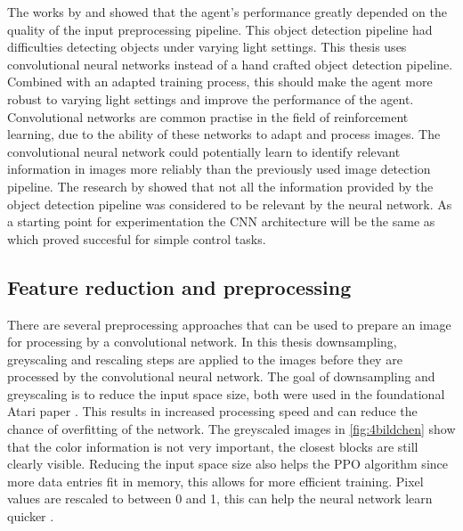 The works by \autocite{merlin_flach} and \autocite{maximilian} showed that the agent's performance greatly depended on the quality of the input preprocessing pipeline. This object detection pipeline had difficulties detecting objects under varying light settings. This thesis uses convolutional neural networks instead of a hand crafted object detection pipeline. Combined with an adapted training process, this should make the agent more robust to varying light settings and improve the performance of the agent.
Convolutional networks are common practise in the field of reinforcement learning, due to the ability of these networks to adapt and process images. The convolutional neural network could potentially learn to identify relevant information in images more reliably than the previously used image detection pipeline. The research by \autocite{merlin_flach} showed that not all the information provided by the object detection pipeline was considered to be relevant by the neural network.
As a starting point for experimentation the CNN architecture will be the same as \autocite{human_level_control} which proved succesful for simple control tasks.




\subsection{Feature reduction and preprocessing}

There are several preprocessing approaches that can be used to prepare an image for processing by a convolutional network. In this thesis downsampling, greyscaling and rescaling steps are applied to the images before they are processed by the convolutional neural network. The goal of downsampling and greyscaling is to reduce the input space size, both were used in the foundational Atari paper \autocite{atari}. This results in increased processing speed and can reduce the chance of overfitting of the network. The greyscaled images in \ref{fig:4bildchen} show that the color information is not very important, the closest blocks are still clearly visible. Reducing the input space size also helps the PPO algorithm since more data entries fit in memory, this allows for more efficient training. Pixel values are rescaled to between 0 and 1, this can help the neural network learn quicker \autocite{jason}.

